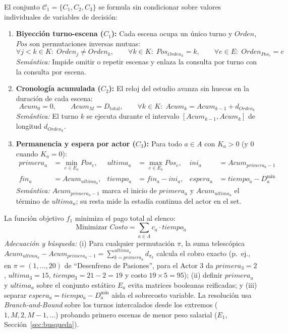 El conjunto $\mathcal{C}_1 = \{C_1, C_2, C_3\}$ se formula sin condicionar sobre valores individuales de variables de decisión:
\begin{enumerate}
    \item \textbf{Biyección turno-escena ($C_1$):} Cada escena ocupa un único turno y $Orden$, $Pos$ son permutaciones inversas mutuas:
    \begin{equation}
        \forall j < k \in K:\; Orden_j \neq Orden_k, \qquad
        \forall k \in K:\; Pos_{Orden_k} = k, \qquad
        \forall e \in E:\; Orden_{Pos_e} = e
        \label{eq:c1_inverse}
    \end{equation}
    \emph{Semántica:} Impide omitir o repetir escenas y enlaza la consulta por turno con la consulta por escena.

    \item \textbf{Cronología acumulada ($C_2$):} El reloj del estudio avanza sin huecos en la duración de cada escena:
    \begin{equation}
        Acum_0 = 0, \qquad Acum_M = D_{\text{total}}, \qquad
        \forall k \in K: \; Acum_k = Acum_{k-1} + d_{Orden_k}
        \label{eq:c2_acum}
    \end{equation}
    \emph{Semántica:} El turno $k$ se ejecuta durante el intervalo $[Acum_{k-1}, Acum_k]$ de longitud $d_{Orden_k}$.

    \item \textbf{Permanencia y espera por actor ($C_3$):} Para todo $a \in A$ con $K_a > 0$ (y $0$ cuando $K_a = 0$):
    \begin{align}
        primera_a &= \min_{e \in E_a} Pos_e, &
        ultima_a &= \max_{e \in E_a} Pos_e, &
        ini_a &= Acum_{primera_a - 1} \label{eq:c3_extremos} \\
        fin_a &= Acum_{ultima_a}, &
        tiempo_a &= fin_a - ini_a, &
        espera_a &= tiempo_a - D^{\min}_a \label{eq:c3_tiempo}
    \end{align}
    \emph{Semántica:} $Acum_{primera_a - 1}$ marca el inicio de $primera_a$ y $Acum_{ultima_a}$ el término de $ultima_a$; su resta mide la estadía continua del actor en el set.
\end{enumerate}

La función objetivo $f_1$ minimiza el pago total al elenco:
\begin{equation}
    \text{Minimizar } Costo = \sum_{a \in A} c_a \cdot tiempo_a
    \label{eq:obj_p1}
\end{equation}
\emph{Adecuación y búsqueda:} (i) Para cualquier permutación $\pi$, la suma telescópica $Acum_{ultima_a} - Acum_{primera_a - 1} = \sum_{k=primera_a}^{ultima_a} d_{\pi_k}$ calcula el cobro exacto (p.\ ej., en $\pi = (1,\dots,20)$ de ``Desenfreno de Pasiones'', para el Actor 3 da $primera_3 = 2$, $ultima_3 = 15$, $tiempo_3 = 21 - 2 = 19$ y costo $19 \times 5 = 95$); (ii) definir $primera_a$ y $ultima_a$ sobre el conjunto estático $E_a$ evita matrices booleanas reificadas; y (iii) separar $espera_a = tiempo_a - D^{\min}_a$ aísla el sobrecosto variable. La resolución usa \emph{Branch-and-Bound} sobre los turnos intercalados desde los extremos ($1, M, 2, M-1, \dots$) probando primero escenas de menor peso salarial ($E_1$, Sección~\ref{sec:busqueda}).
